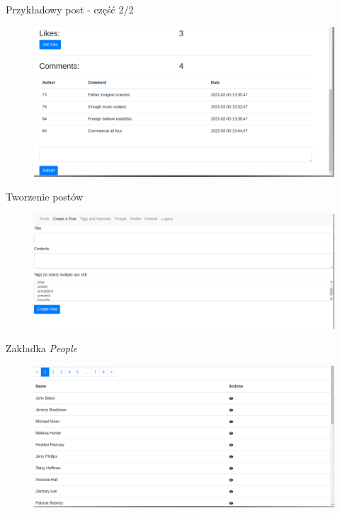 \documentclass[handout]{beamer}
\begin{document}
        \begin{frame}{Przykładowy post - część 2/2}
            \begin{figure}
                \centering
                \includegraphics[width=\linewidth]{example_post_part_2.png}
            \end{figure}
        \end{frame}
        
        \begin{frame}{Tworzenie postów}
            \begin{figure}
                \centering
                \includegraphics[width=\linewidth]{post_creation.png}
            \end{figure}
        \end{frame}
        
        \begin{frame}{Zakładka \textit{People}}
            \begin{figure}
                \centering
                \includegraphics[width=\linewidth]{people.png}
            \end{figure}
        \end{frame}
        
\end{document}
